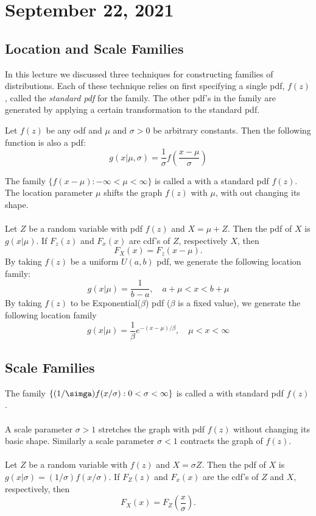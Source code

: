 \section{September 22, 2021}
\subsection{Location and Scale Families}
In this lecture we discussed three techniques for constructing families of distributions. Each of these technique relies on first specifying a single pdf,
$f(z)$, called the \textit{standard pdf} for the family. The other pdf's in the family are generated by applying a certain transformation to the standard pdf. 

\begin{theorem}
    Let $f(z)$ be any odf and $\mu$ and $\sigma >0$ be arbitrary constants. Then the following function is also a pdf:
    $$
    g(x|\mu, \sigma) = \frac{1}{\sigma}f \left ( 
    \frac{x-\mu}{\sigma}
    \right )
    $$
\end{theorem}
The family $\{ f(x-\mu): - \infty < \mu < \infty \}$ is called a  with a standard pdf $f(z)$. The location parameter $\mu$ shifts the graph $f(z)$ with $\mu$, with out changing its shape.\\
\\
 Let $Z$ be a random variable with pdf $f(z)$ and $X = \mu + Z$. Then the pdf of $X$ is $g(x|\mu)$. If $F_z(z)$ and $F_x(x)$ are cdf's of $Z$, respectively $X$, then
$$
F_X(x) = F_z(x-\mu).
$$
 By taking $f(z)$ be a uniform $U(a,b)$ pdf, we generate the following location family:
$$
g(x|\mu) = \frac{1}{b-a}, \quad a+\mu < x < b + \mu
$$
 By taking $f(z)$ to be Exponential($\beta$) pdf ($\beta$ is a fixed value), we generate the following location family
$$
g(x|\mu) = \frac{1}{\beta}e^{-(x-\mu)/\beta}, \quad \mu <x< \infty
$$
\subsection{Scale Families}
The family $\{ (1/ \simga)f(x/ \sigma): 0 < \sigma < \infty \}$ is called a  with standard pdf $f(z)$.
\\ \\
A scale parameter $\sigma > 1$ stretches the graph with pdf $f(z)$ without changing its basic shape. Similarly a scale parameter $\sigma < 1$ contracts the graph of $f(z)$. 
\\\\
 Let $Z$ be a random variable with $f(z)$ and $X = \sigma Z$. Then the pdf of $X$ is $g(x|\sigma) = (1/\sigma)f(x/\sigma)$. If $F_Z(z)$ and $F_x(x)$ are the cdf's of $Z$ and $X$,  respectively, then
$$
F_X(x) = F_Z \left( \frac{x}{\sigma} \right).
$$

